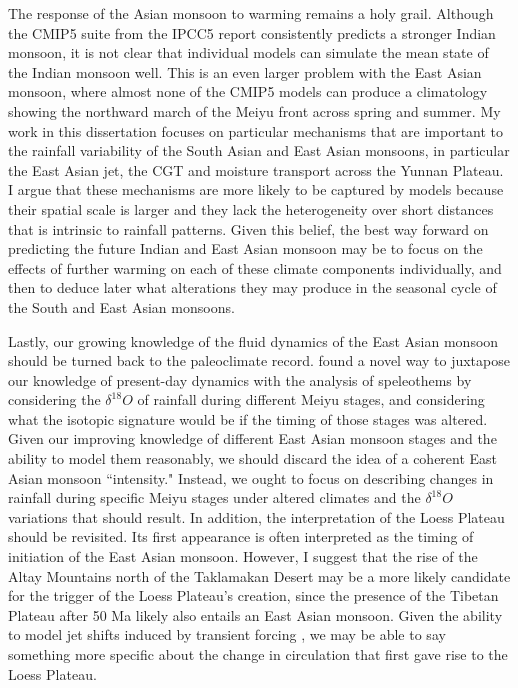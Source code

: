 	The response of the Asian monsoon to warming remains a holy grail. Although the CMIP5 suite from the IPCC5 report consistently predicts a stronger Indian monsoon, it is not clear that individual models can simulate the mean state of the Indian monsoon well. This is an even larger problem with the East Asian monsoon, where almost none of the CMIP5 models can produce a climatology showing the northward march of the Meiyu front across spring and summer. My work in this dissertation focuses on particular mechanisms that are important to the rainfall variability of the South Asian and East Asian monsoons, in particular the East Asian jet, the CGT and moisture transport across the Yunnan Plateau. I argue that these mechanisms are more likely to be captured by models because their spatial scale is larger and they lack the heterogeneity over short distances that is intrinsic to rainfall patterns. Given this belief, the best way forward on predicting the future Indian and East Asian monsoon may be to focus on the effects of further warming on each of these climate components individually, and then to deduce later what alterations they may produce in the seasonal cycle of the South and East Asian monsoons.
	
	Lastly, our growing knowledge of the fluid dynamics of the East Asian monsoon should be turned back to the paleoclimate record. \citet{Chiang2015} found a novel way to juxtapose our knowledge of present-day dynamics with the analysis of speleothems by considering the $\delta ^{18}O$ of rainfall during different Meiyu stages, and considering what the isotopic signature would be if the timing of those stages was altered. Given our improving knowledge of different East Asian monsoon stages and the ability to model them reasonably, we should discard the idea of a coherent East Asian monsoon ``intensity." Instead, we ought to focus on describing changes in rainfall during specific Meiyu stages under altered climates and the $\delta ^{18}O$ variations that should result. In addition, the interpretation of the Loess Plateau should be revisited. Its first appearance is often interpreted as the timing of initiation of the East Asian monsoon. However, I suggest that the rise of the Altay Mountains north of the Taklamakan Desert may be a more likely candidate for the trigger of the Loess Plateau's creation, since the presence of the Tibetan Plateau after 50 Ma likely also entails an East Asian monsoon. Given the ability to model jet shifts induced by transient forcing \citep{Liu2012}, we may be able to say something more specific about the change in circulation that first gave rise to the Loess Plateau.